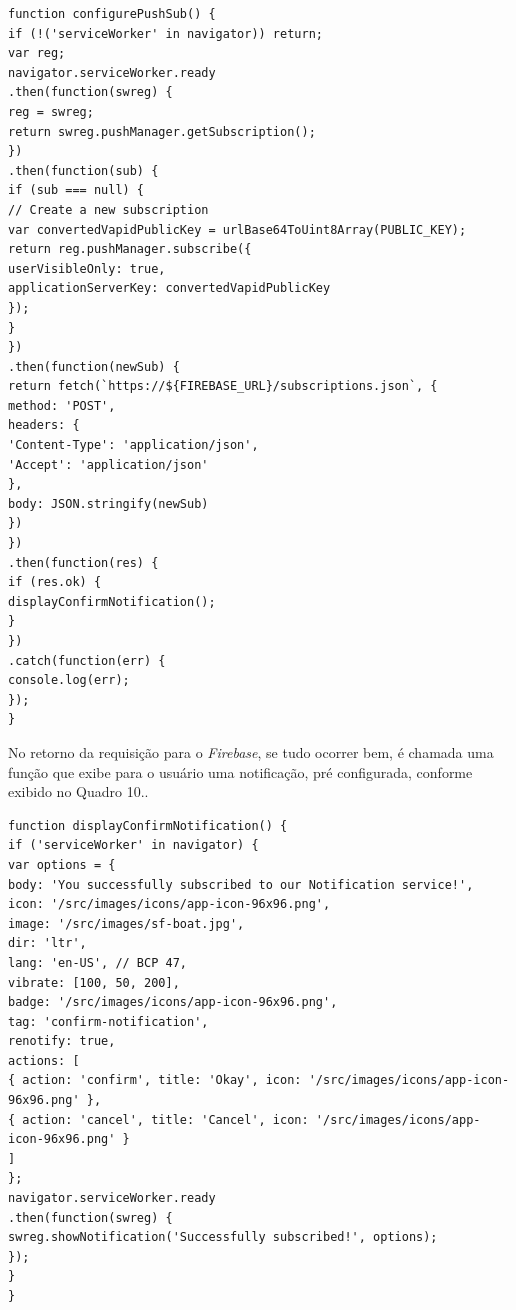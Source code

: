 \begin{lstlisting}[frame=single,label=lst:inscricao,caption=Configurando Push Notifications, basicstyle=\footnotesize]
function configurePushSub() {
if (!('serviceWorker' in navigator)) return;
var reg;
navigator.serviceWorker.ready
.then(function(swreg) {
reg = swreg;
return swreg.pushManager.getSubscription();
})
.then(function(sub) {
if (sub === null) {
// Create a new subscription
var convertedVapidPublicKey = urlBase64ToUint8Array(PUBLIC_KEY);
return reg.pushManager.subscribe({
userVisibleOnly: true,
applicationServerKey: convertedVapidPublicKey
});
}
})
.then(function(newSub) {
return fetch(`https://${FIREBASE_URL}/subscriptions.json`, {
method: 'POST',
headers: {
'Content-Type': 'application/json',
'Accept': 'application/json'
},
body: JSON.stringify(newSub)
})
})
.then(function(res) {
if (res.ok) {
displayConfirmNotification();
}
})
.catch(function(err) {
console.log(err);
});
}
\end{lstlisting}
\vspace{-0.75cm}
\begin{center}
\end{center}


\newpage
No retorno da requisição para o \textit{Firebase}, se tudo ocorrer bem, é chamada uma função que exibe para o usuário uma notificação, pré configurada, conforme exibido no Quadro 10..
\begin{lstlisting}[frame=single,label=lst:pushNotificacao,caption= Notificação Pré configurada, basicstyle=\footnotesize]
function displayConfirmNotification() {
if ('serviceWorker' in navigator) {
var options = {
body: 'You successfully subscribed to our Notification service!',
icon: '/src/images/icons/app-icon-96x96.png',
image: '/src/images/sf-boat.jpg',
dir: 'ltr',
lang: 'en-US', // BCP 47,
vibrate: [100, 50, 200],
badge: '/src/images/icons/app-icon-96x96.png',
tag: 'confirm-notification',
renotify: true,
actions: [
{ action: 'confirm', title: 'Okay', icon: '/src/images/icons/app-icon-96x96.png' },
{ action: 'cancel', title: 'Cancel', icon: '/src/images/icons/app-icon-96x96.png' }
]
};
navigator.serviceWorker.ready
.then(function(swreg) {
swreg.showNotification('Successfully subscribed!', options);
});
}
}
\end{lstlisting}
\vspace{-0.75cm}
\begin{center}
\end{center}

